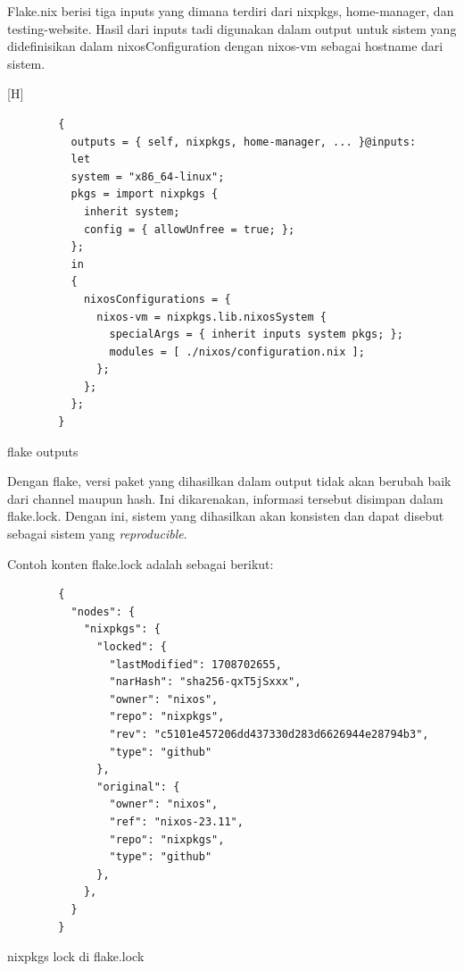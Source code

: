 \documentclass[10pt,]{report}
\newenvironment{code}{\captionsetup{type=listing}}{\vspace{3mm}}
\begin{document}
\begin{adjustwidth}{20pt}{}
\begin{adjustwidth}{20pt}{}
		Flake.nix berisi tiga inputs yang dimana terdiri dari nixpkgs, home-manager,
		dan testing-website. Hasil dari inputs tadi digunakan dalam output untuk
		sistem yang didefinisikan dalam nixosConfiguration dengan nixos-vm sebagai
		hostname dari sistem.

		\begin{code}[H]
			\begin{verbatim}
        {
          outputs = { self, nixpkgs, home-manager, ... }@inputs:
          let
          system = "x86_64-linux";
          pkgs = import nixpkgs {
            inherit system;
            config = { allowUnfree = true; };
          };
          in
          {
            nixosConfigurations = {
              nixos-vm = nixpkgs.lib.nixosSystem {
                specialArgs = { inherit inputs system pkgs; };
                modules = [ ./nixos/configuration.nix ];
              };
            };
          };
        }
      \end{verbatim}
			\caption{flake outputs}
		\end{code}

		Dengan flake, versi paket yang dihasilkan dalam output tidak akan berubah
		baik dari channel maupun hash. Ini dikarenakan, informasi tersebut disimpan
		dalam flake.lock. Dengan ini, sistem yang dihasilkan akan konsisten dan
		dapat disebut sebagai sistem yang \textit{reproducible}.

		Contoh konten flake.lock adalah sebagai berikut:

		\begin{code}
			\begin{verbatim}
        {
          "nodes": {
            "nixpkgs": {
              "locked": {
                "lastModified": 1708702655,
                "narHash": "sha256-qxT5jSxxx",
                "owner": "nixos",
                "repo": "nixpkgs",
                "rev": "c5101e457206dd437330d283d6626944e28794b3",
                "type": "github"
              },
              "original": {
                "owner": "nixos",
                "ref": "nixos-23.11",
                "repo": "nixpkgs",
                "type": "github"
              },
            },
          }
        }
      \end{verbatim}
			\caption{nixpkgs lock di flake.lock}
		\end{code}


	\end{adjustwidth}

\end{adjustwidth}
\end{document}

